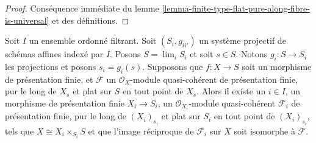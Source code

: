 \begin{proof}
Conséquence immédiate du
lemme \ref{lemma-finite-type-flat-pure-along-fibre-is-universal}
et des définitions.
\end{proof}

\begin{lemma}
\label{lemma-limit-purity}
Soit $I$ un ensemble ordonné filtrant.
Soit $(S_i, g_{ii'})$ un système projectif de schémas affines indexé par $I$.
Posons $S = \lim_i S_i$ et soit $s \in S$.
Notons $g_i : S \to S_i$ les projections et posons $s_i = g_i(s)$.
Supposons que $f : X \to S$ soit un morphisme de présentation finie,
et $\mathcal{F}$ un $\mathcal{O}_X$-module quasi-cohérent de présentation finie,
pur le long de $X_s$ et plat sur $S$ en tout point de $X_s$.
Alors il existe un $i \in I$, un morphisme de présentation finie
$X_i \to S_i$, un $\mathcal{O}_{X_i}$-module quasi-cohérent $\mathcal{F}_i$
de présentation finie, pur le long de $(X_i)_{s_i}$ et plat sur $S_i$
en tout point de $(X_i)_{s_i}$, tels que $X \cong X_i \times_{S_i} S$
et que l'image réciproque de $\mathcal{F}_i$ sur $X$ soit isomorphe
à $\mathcal{F}$.
\end{lemma}

